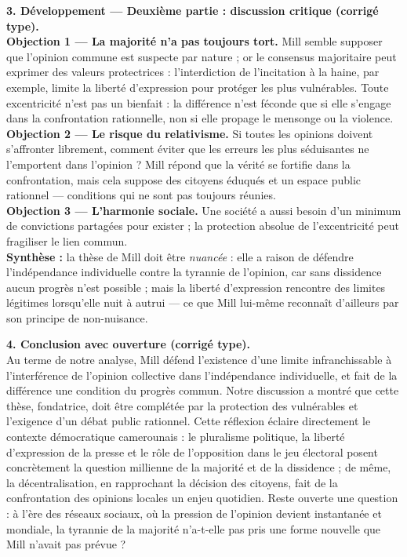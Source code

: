 \documentclass[11pt]{article}
\begin{document}
\begin{exoresolu}
\textbf{3. Développement — Deuxième partie : discussion critique (corrigé type).}\\
\textbf{Objection 1 — La majorité n'a pas toujours tort.} Mill semble supposer que l'opinion commune est suspecte par nature ; or le consensus majoritaire peut exprimer des valeurs protectrices : l'interdiction de l'incitation à la haine, par exemple, limite la liberté d'expression pour protéger les plus vulnérables. Toute \og excentricité \fg n'est pas un bienfait : la différence n'est féconde que si elle s'engage dans la confrontation rationnelle, non si elle propage le mensonge ou la violence.\\
\textbf{Objection 2 — Le risque du relativisme.} Si toutes les opinions doivent s'affronter librement, comment éviter que les erreurs les plus séduisantes ne l'emportent dans l'opinion ? Mill répond que la vérité \og se fortifie \fg dans la confrontation, mais cela suppose des citoyens éduqués et un espace public rationnel — conditions qui ne sont pas toujours réunies.\\
\textbf{Objection 3 — L'harmonie sociale.} Une société a aussi besoin d'un minimum de convictions partagées pour exister ; la protection absolue de l'excentricité peut fragiliser le lien commun.\\
\textbf{Synthèse :} la thèse de Mill doit être \emph{nuancée} : elle a raison de défendre l'indépendance individuelle contre la tyrannie de l'opinion, car sans dissidence aucun progrès n'est possible ; mais la liberté d'expression rencontre des limites légitimes lorsqu'elle nuit à autrui — ce que Mill lui-même reconnaît d'ailleurs par son principe de non-nuisance.

\textbf{4. Conclusion avec ouverture (corrigé type).}\\
Au terme de notre analyse, Mill défend l'existence d'une limite infranchissable à l'interférence de l'opinion collective dans l'indépendance individuelle, et fait de la différence une condition du progrès commun. Notre discussion a montré que cette thèse, fondatrice, doit être complétée par la protection des vulnérables et l'exigence d'un débat public rationnel. Cette réflexion éclaire directement le contexte démocratique camerounais : le pluralisme politique, la liberté d'expression de la presse et le rôle de l'opposition dans le jeu électoral posent concrètement la question millienne de la majorité et de la dissidence ; de même, la décentralisation, en rapprochant la décision des citoyens, fait de la confrontation des opinions locales un enjeu quotidien. Reste ouverte une question : à l'ère des réseaux sociaux, où la pression de l'opinion devient instantanée et mondiale, la tyrannie de la majorité n'a-t-elle pas pris une forme nouvelle que Mill n'avait pas prévue ?
\end{exoresolu}
\end{document}
